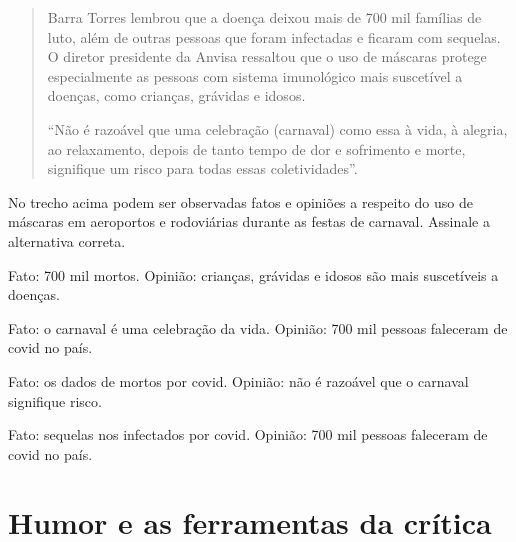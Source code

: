 \begin{quote}

Barra Torres lembrou que a doença deixou mais de 700 mil famílias de
luto, além de outras pessoas que foram infectadas e ficaram com
sequelas. O diretor presidente da Anvisa ressaltou que o uso de máscaras
protege especialmente as pessoas com sistema imunológico mais suscetível
a doenças, como crianças, grávidas e idosos.  

``Não é razoável que uma celebração (carnaval) como essa à vida, à
alegria, ao relaxamento, depois de tanto tempo de dor e sofrimento e
morte, signifique um risco para todas essas coletividades''.

\end{quote}


No trecho acima podem ser observadas fatos e opiniões a respeito do uso
de máscaras em aeroportos e rodoviárias durante as festas de carnaval.
Assinale a alternativa correta.

\begin{escolha}

  \item Fato: 700 mil mortos. Opinião: crianças, grávidas e idosos são mais suscetíveis a doenças.

  \item Fato: o carnaval é uma celebração da vida. Opinião: 700 mil pessoas faleceram de covid no país.
  
  \item Fato: os dados de mortos por covid. Opinião: não é razoável que o carnaval signifique risco.
  
  \item Fato: sequelas nos infectados por covid. Opinião: 700 mil pessoas faleceram de covid no país.

\end{escolha}


\chapter{Humor e as ferramentas da crítica}


